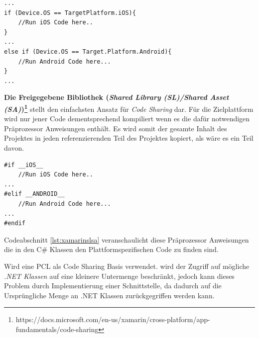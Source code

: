 	\begin{lstlisting}[caption={Plattform spezifischen Code in PCL ausführen},label={lst:xamarinpcl},captionpos=b,style=csharp]
...
if (Device.OS == TargetPlatform.iOS){
	//Run iOS Code here..
}
...
else if (Device.OS == Target.Platform.Android){
	//Run Android Code here...
}
...
	\end{lstlisting}

	\textbf{Die Freigegebene Bibliothek (\textit{Shared Library (SL)/Shared Asset (SA)})\footnote{https://docs.microsoft.com/en-us/xamarin/cross-platform/app-fundamentals/code-sharing}} stellt den einfachsten Ansatz für \textit{Code Sharing} dar. Für die Zielplattform wird nur jener Code dementsprechend kompiliert wenn es die dafür notwendigen Präprozessor Anweisungen enthält. Es wird somit der gesamte Inhalt des Projektes in jeden referenzierenden Teil des Projektes kopiert, als wäre es ein Teil davon.\\

	\begin{lstlisting}[caption={Plattform spezifischen Code in SA/SL ausführen},label={lst:xamarinslsa},captionpos=b,style=csharp]
#if __iOS__
	//Run iOS Code here..
...
#elif __ANDROID__
	//Run Android Code here...
...
#endif
	\end{lstlisting}

	Codeabschnitt \ref{lst:xamarinslsa} veranschaulicht diese Präprozessor Anweisungen die in den C\# Klassen den Plattformspezifischen Code zu finden sind.

	Wird eine PCL als Code Sharing Basis verwendet. wird der Zugriff auf mögliche \textit{.NET Klassen} auf eine kleinere Untermenge beschränkt, jedoch kann dieses Problem durch Implementierung einer Schnittstelle, da dadurch auf die Ursprüngliche Menge an .NET Klassen zurückgegriffen werden kann.



















